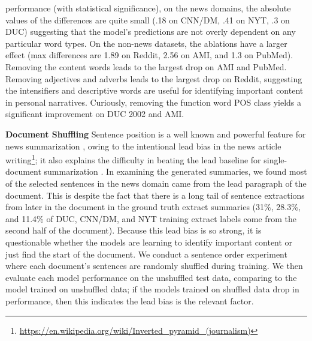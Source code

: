 performance (with statistical significance), on the news domains,
the absolute values of the differences are quite small 
(.18 on CNN/DM, .41 on NYT, .3 on DUC) suggesting that the model's predictions
are not overly dependent on any particular word types.
On the non-news datasets, the ablations have a larger effect 
(max differences are 1.89 on Reddit, 2.56 on AMI, and 1.3 on PubMed).
Removing the content words leads to the largest drop on AMI and PubMed.
Removing adjectives and adverbs leads to the largest drop on Reddit,
suggesting the intensifiers and descriptive words are useful for 
identifying important content in personal narratives.
Curiously, 
removing the function word POS class yields a significant improvement
on DUC 2002 and AMI.




\textbf{Document Shuffling} Sentence position is a well known and 
powerful feature for news summarization \cite{hong2014improving}, owing 
to the intentional lead bias in the news article writing\footnote{\url{https://en.wikipedia.org/wiki/Inverted_pyramid_(journalism)}}; it also explains the difficulty in beating
the lead baseline for single-document summarization 
\cite{nenkova2005automatic,rau:1999}.
In examining the generated summaries, we found
most of the selected sentences in the news domain came from the lead paragraph
of the document. This is despite the fact that there is a long tail of 
sentence extractions from later in the document in the ground truth extract 
summaries (31\%, 28.3\%, and 11.4\% of DUC, CNN/DM, and NYT training extract labels come 
from the second half of the document). 
Because this lead bias is so strong, it is questionable whether
the models are learning to identify important content or just find the start
of the document. We conduct a sentence order experiment where 
each document's sentences are randomly shuffled during training. We then
evaluate each model performance on the unshuffled test data, comparing to 
the model trained on unshuffled data; if the models trained on shuffled data
drop in performance, then this indicates the lead bias is the relevant factor.

